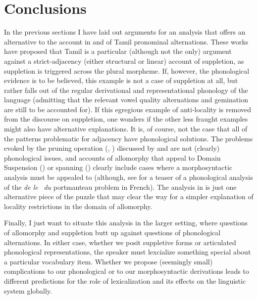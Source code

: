 \documentclass[output=paper]{langscibook}
\begin{document}
\section{Conclusions}\label{sec:newell:4}

In the previous sections I have laid out arguments for an analysis that offers an alternative to the account in \citet{Moskal2015} and \citet{moskal2016towards} of Tamil pronominal alternations. These works have proposed that Tamil is a particular (although not the only) argument against a strict-adjacency (either structural or linear) account of suppletion, as suppletion is triggered across the plural morpheme. If, however, the phonological evidence is to be believed, this example is not a case of suppletion at all, but rather falls out of the regular derivational and representational phonology of the language (admitting that the relevant vowel quality alternations and gemination are still to be accounted for). If this egregious example of anti-locality is removed from the discourse on suppletion, one wonders if the other less fraught examples might also have alternative explanations. It is, of course, not the case that all of the patterns problematic for adjacency have phonological solutions. The  problems evoked by the pruning operation (\citealt{Embick2003}, \citeyear{embick2010localism}) discussed by \citet{Moskal2015} and \citet{moskal2016towards} are not (clearly) phonological issues, and accounts of allomorphy that appeal to Domain Suspension (\citealt{bobaljik2012universals,BobaljikWurmbrand2013}) or spanning (\citealt{Merchant2015,svenonius2016spans}) clearly include cases where a morphosyntactic analysis must be appealed to (although, see \citet{newell2018re} for a teaser of a phonological analysis of the\textit{ de le} \rightarrow\ \textit{du} portmanteau problem in French). The analysis in  is just one alternative piece of the puzzle that may clear the way for a simpler explanation of locality restrictions in the domain of allomorphy.

Finally, I just want to situate this analysis in the larger setting, where questions of allomorphy and suppletion butt up against questions of phonological alternations. In either case, whether we posit suppletive forms or articulated phonological representations, the speaker must lexcialize something special about a particular vocabulary item. Whether we propose (seemingly small) complications to our phonological or to our morphosyntactic derivations leads to different predictions for the role of lexicalization and its effects on the linguistic system globally.
\end{document}
